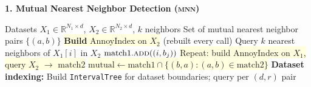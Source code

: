 \documentclass[8pt]{article}
\begin{document}
{\large\bfseries 1. Mutual Nearest Neighbor Detection (\textsc{mnn})}

\vspace{3pt}

\begin{tcolorbox}[
    title={\textbf{Algorithm 1a:} Original Scanorama --- Set-based MNN with IntervalTree},
    colback=white, colframe=black!60, fonttitle=\small\bfseries,
    boxrule=0.5pt, arc=2pt, left=4pt, right=4pt, top=2pt, bottom=2pt
]
\begin{algorithmic}[1]
\small
\Require Datasets $X_1 \in \mathbb{R}^{N_1 \times d}$, $X_2 \in \mathbb{R}^{N_2 \times d}$, $k$ neighbors
\Ensure Set of mutual nearest neighbor pairs $\{(a, b)\}$
\State \colorbox{lightyellow}{\textbf{Build} AnnoyIndex on $X_2$} (rebuilt every call) \Comment{\textcolor{removed}{No caching}}
    \State Query $k$ nearest neighbors of $X_1[i]$ in $X_2$
        \State $\text{match1}.\textsc{add}((i, b_j))$ 
    \EndFor
\EndFor
\State \colorbox{lightyellow}{Repeat: build AnnoyIndex on $X_1$, query $X_2$ $\to$ $\text{match2}$}
\State \colorbox{lightyellow}{$\text{mutual} \gets \text{match1} \cap \{(b, a) : (a, b) \in \text{match2}\}$} \Comment{\textcolor{removed}{Set intersection over $O(Nk)$ tuples}}
\State \textbf{Dataset indexing:} Build \texttt{IntervalTree} for dataset boundaries; query per $(d, r)$ pair
\end{algorithmic}
\end{tcolorbox}

\vspace{4pt}
\end{document}
